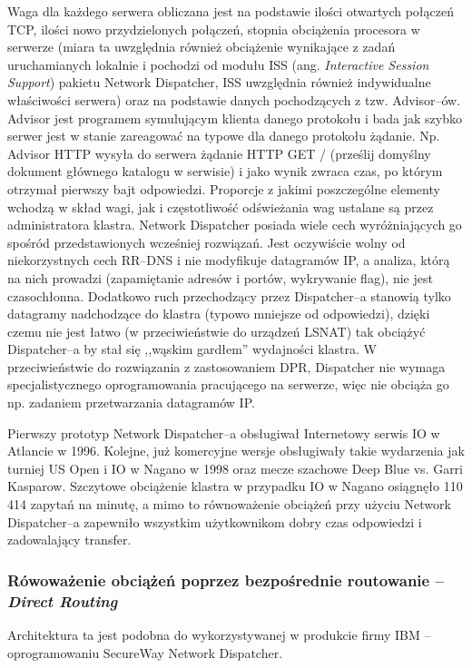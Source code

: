 Waga dla każdego serwera obliczana jest na podstawie ilości otwartych połączeń TCP, ilości nowo 
przydzielonych połączeń, stopnia obciążenia procesora w serwerze (miara ta uwzględnia również obciążenie 
wynikające z zadań uruchamianych lokalnie i pochodzi od modułu ISS (ang. \emph{Interactive Session Support}) pakietu 
Network Dispatcher, ISS uwzględnia również indywidualne właściwości serwera) oraz na podstawie danych 
pochodzących z tzw. Advisor--ów. Advisor jest programem symulującym klienta danego protokołu i bada jak szybko 
serwer jest w stanie zareagować na typowe dla danego protokołu żądanie. Np. Advisor HTTP wysyła do serwera 
żądanie HTTP GET / (prześlij domyślny dokument głównego katalogu w serwisie) i jako wynik zwraca czas, po którym 
otrzymał pierwszy bajt odpowiedzi. Proporcje z jakimi poszczególne elementy wchodzą w skład wagi, jak i 
częstotliwość odświeżania wag ustalane są przez administratora klastra.
Network Dispatcher posiada wiele cech wyróżniających go spośród przedstawionych wcześniej rozwiązań. 
Jest oczywiście wolny od niekorzystnych cech RR--DNS i nie modyfikuje datagramów IP, a analiza, którą na nich 
prowadzi (zapamiętanie adresów i portów, wykrywanie flag), nie jest czasochłonna. Dodatkowo ruch przechodzący 
przez Dispatcher--a stanowią tylko datagramy nadchodzące do klastra (typowo mniejsze od odpowiedzi), dzięki 
czemu nie jest łatwo (w przeciwieństwie do urządzeń LSNAT) tak obciążyć Dispatcher--a by stał się ,,wąskim 
gardłem'' wydajności klastra. W przeciwieństwie do rozwiązania z zastosowaniem DPR, Dispatcher nie wymaga 
specjalistycznego oprogramowania pracującego na serwerze, więc nie obciąża go np. zadaniem przetwarzania 
datagramów IP.

Pierwszy prototyp Network Dispatcher--a obsługiwał Internetowy serwis IO w Atlancie w 1996. Kolejne, 
już komercyjne wersje obsługiwały takie wydarzenia jak turniej US Open i IO w Nagano w 1998 oraz mecze szachowe 
Deep Blue vs. Garri Kasparow. Szczytowe obciążenie klastra w przypadku IO w Nagano osiągnęło 110 414 zapytań na
 minutę, a mimo to równoważenie obciążeń przy użyciu Network Dispatcher--a zapewniło wszystkim użytkownikom dobry 
czas odpowiedzi i zadowalający transfer.

\subsubsection{Rówoważenie obciążeń poprzez bezpośrednie routowanie -- \emph{Direct Routing}}

Architektura ta jest podobna do wykorzystywanej w produkcie firmy IBM -- oprogramowaniu SecureWay Network Dispatcher. 

